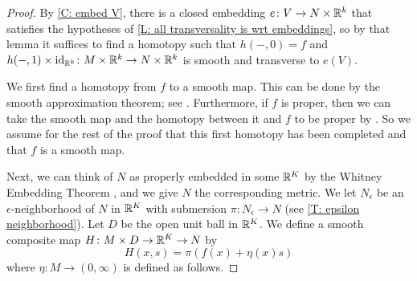 \begin{comment}\greg{Old version of this had a bit about $M$ having boundary and keeping the $f$ restricted to boundary fixed if it was already good. Got rid of that to add proper without trouble. Need to make sure I never really need the boundary thing. Changeover around 9-11-23. Though see also the next theorem I added for homotopies.}
6-20-25 - I looked at where this is referenced and it seems ok.
\end{comment}

\begin{proof}
	By \cref{C: embed V}, there is a closed embedding $e \colon V \to N \times \mathbb{R}^k$ that satisfies the hypotheses of \cref{L: all transversality is wrt embeddings}, so by that lemma it suffices to find a homotopy such that $h(-,0) = f$ and $h(-,1) \times \mathrm{id}_{\mathbb{R}^k} \colon M \times \mathbb{R}^k \to N \times \mathbb{R}^k$ is smooth and transverse to $e(V)$.

	We first find a homotopy from $f$ to a smooth map.
	This can be done by the smooth approximation theorem; see \cite[Corollary 9.2.31]{MaDo92}.
	Furthermore, if $f$ is proper, then we can take the smooth map and the homotopy between it and $f$ to be proper by \cite[Corollary 9.2.36]{MaDo92}.
	So we assume for the rest of the proof that this first homotopy has been completed and that $f$ is a smooth map.
	\begin{comment}
	We will next construct our homotopy to achieve transversality without consideration of whether or not $f$ is already transverse to $g$ on $\bd M$, and then we show how to modify the construction for that case.
	\end{comment}

	Next, we can think of $N$ as properly embedded in some $\mathbb{R}^K$ by the Whitney Embedding Theorem \cite[Section 1.8]{GuPo74}, and we give $N$ the corresponding metric.
	We let $N_\epsilon$ be an $\epsilon$-neighborhood of $N$ in $\mathbb{R}^K$ with submersion $\pi \colon N_\epsilon \to N$ (see \cref{T: epsilon neighborhood}).
	Let $D$ be the open unit ball in $\mathbb{R}^K$.
	We define a smooth composite map $H \colon M \times D \to \mathbb{R}^K \to N$ by
	$$H(x,s) = \pi(f(x)+ \eta(x)s)$$
	where $\eta \colon M \to (0,\infty)$ is defined as follows.


\end{proof}

